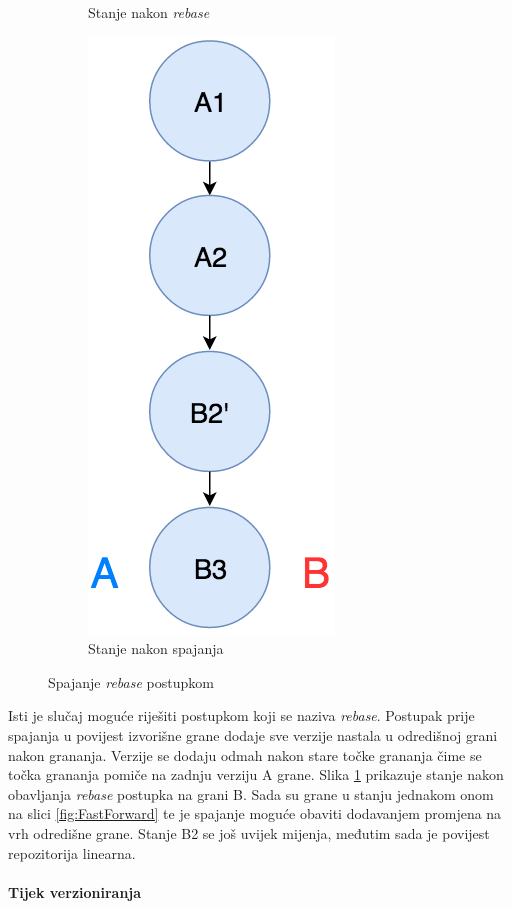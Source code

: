 \documentclass[times, utf8, diplomski, numeric]{fer}
\begin{document}
\begin{figure}[b!]
\begin{subfigure}{.3\textwidth}
\caption{Stanje nakon \textit{rebase}}
\label{fig:RebaseB}
\end{subfigure}
\begin{subfigure}{.3\textwidth}
\centering
\includegraphics[scale=0.5]{RebaseC}
\caption{Stanje nakon spajanja}
\label{fig:RebaseC}
\end{subfigure}
\caption{Spajanje \textit{rebase} postupkom}
\label{fig:Rebase}
\end{figure}

Isti je slučaj moguće riješiti postupkom koji se naziva \textit{rebase}. Postupak prije spajanja u povijest izvorišne grane dodaje sve verzije nastala u odredišnoj grani nakon grananja. Verzije se dodaju odmah nakon stare točke grananja čime se točka grananja pomiče na zadnju verziju A grane. Slika \ref{fig:RebaseB} prikazuje stanje nakon obavljanja \textit{rebase} postupka na grani B. Sada su grane u stanju jednakom onom na slici \ref{fig:FastForward} te je spajanje moguće obaviti dodavanjem promjena na vrh odredišne grane. Stanje B2 se još uvijek mijenja, međutim sada je povijest repozitorija linearna.


\paragraph{Tijek verzioniranja} \label{header:Implementacija_verzioniranja}
\end{document}
